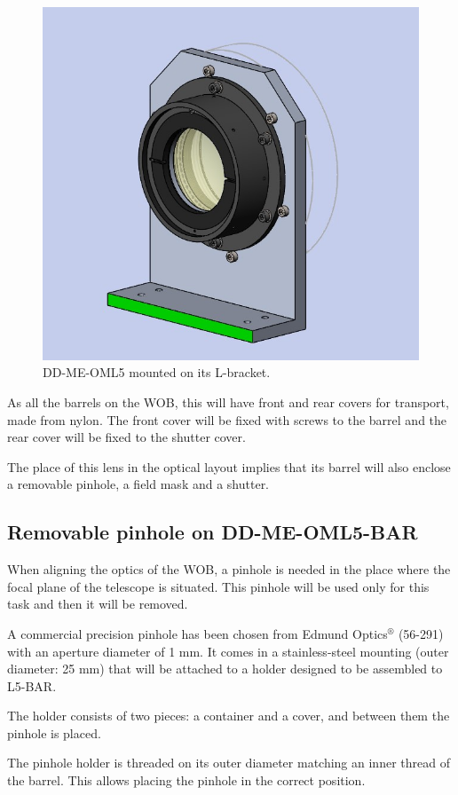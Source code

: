 \documentclass{report}
\begin{document}
\begin{figure}
\begin{center}
\includegraphics[width=0.7\linewidth]{figures/DD-OML5-LBr.jpg}
\end{center}
\caption{DD-ME-OML5 mounted on its L-bracket.}
\label{figure:WOB_OML5_LBr}
\end{figure}

As all the barrels on the WOB, this will have front and rear covers for transport, made from nylon. The front cover will be fixed with screws to the barrel and the rear cover will be fixed to the shutter cover.

The place of this lens in the optical layout implies that its barrel will also enclose a removable pinhole, a field mask and a shutter. 

\subsection{Removable pinhole on DD-ME-OML5-BAR}

When aligning the optics of the WOB, a pinhole is needed in the place where the focal plane of the telescope is situated. This pinhole will be used only for this task and then it will be removed.

A commercial precision pinhole has been chosen from Edmund Optics${}^\circledR $ (56-291) with an aperture diameter of 1 mm. It comes in a stainless-steel mounting (outer diameter: 25 mm) that will be attached to a holder designed to be assembled to L5-BAR.

The holder consists of two pieces: a container and a cover, and between them the pinhole is placed.

The pinhole holder is threaded on its outer diameter matching an inner thread of the barrel. This allows placing the pinhole in the correct position.
\end{document}
